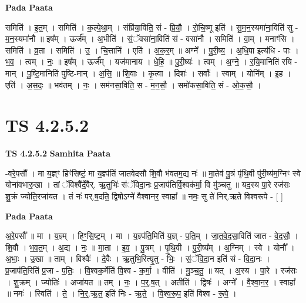 \documentclass[17pt]{extarticle}
\begin{document}
\textbf{Pada Paata} \newline

समिति॑ । इ॒त॒म् । समिति॑ । क॒ल्पे॒था॒म् । संप्रि॑या॒विति॒ सं - प्रि॒यौ॒ । रो॒चि॒ष्णू इति॑ । सु॒म॒न॒स्यमा॑ना॒विति॑ सु - म॒न॒स्यमा॑नौ ॥ इष᳚म् । ऊर्ज᳚म् । अ॒भीति॑ । सं॒ॅवसा॑ना॒विति॑ सं - वसा॑नौ । समिति॑ । वा॒म् । मनाꣳ॑सि । समिति॑ । व्र॒ता । समिति॑ । उ॒ । चि॒त्तानि॑ । एति॑ । अ॒क॒र॒म् ॥ अग्ने᳚ । पु॒री॒ष्य॒ । अ॒धि॒पा इत्य॑धि - पाः । भ॒व॒ । त्वम् । नः॒ ॥ इष᳚म् । ऊर्ज᳚म् । यज॑मानाय । धे॒हि॒ ॥ पु॒री॒ष्यः॑ । त्वम् । अ॒ग्ने॒ । र॒यि॒मानिति॑ रयि - मान् । पु॒ष्टि॒मानिति॑ पुष्टि-मान् । अ॒सि॒ ॥ शि॒वाः । कृ॒त्वा । दिशः॑ । सर्वाः᳚ । स्वाम् । योनि᳚म् । इ॒ह । एति॑ । अ॒स॒दः॒ ॥ भव॑तम् । नः॒ । सम॑नसा॒विति॒ स - म॒न॒सौ॒ । समो॑कसा॒विति॒ सं - ओ॒क॒सौ॒ ।  \newline




\section*{ TS 4.2.5.2 }

\textbf{TS 4.2.5.2 } \newline
\textbf{Samhita Paata} \newline

-वरे॒पसौ᳚ । मा य॒ज्ञ्ꣳ हिꣳ॑सिष्टं॒ मा य॒ज्ञ्प॑तिं जातवेदसौ शि॒वौ भ॑वतम॒द्य नः॑ ॥ मा॒तेव॑ पु॒त्रं पृ॑थि॒वी पु॑री॒ष्य॑म॒ग्निꣳ स्वे योना॑वभारु॒खा । तां ॅविश्वै᳚र्दे॒वैर्. ऋ॒तुभिः॑ संॅविदा॒नः प्र॒जाप॑तिर्वि॒श्वक॑र्मा॒ वि मु॑ञ्चतु ॥ यद॒स्य पा॒रे रज॑सः शु॒क्रं ज्योति॒रजा॑यत । तं नः॑ पर्.ष॒दति॒ द्विषोऽग्ने॑ वैश्वानर॒ स्वाहा᳚ ॥ नमः॒ सु ते॑ निर्.ऋते विश्वरूपे - [  ] \newline

\textbf{Pada Paata} \newline

अ॒रे॒पसौ᳚ ॥ मा । य॒ज्ञ्म् । हिꣳ॒॒सि॒ष्ट॒म् । मा । य॒ज्ञ्प॑ति॒मिति॑ य॒ज्ञ् - प॒ति॒म् । जा॒त॒वे॒द॒सा॒विति॑ जात - वे॒द॒सौ॒ । शि॒वौ । भ॒व॒त॒म् । अ॒द्य । नः॒ ॥ मा॒ता । इ॒व॒ । पु॒त्रम् । पृ॒थि॒वी । पु॒री॒ष्य᳚म् । अ॒ग्निम् । स्वे । योनौ᳚ । अ॒भाः॒ । उ॒खा ॥ ताम् । विश्वैः᳚ । दे॒वैः । ऋ॒तुभि॒रित्यृ॒तु - भिः॒ । सं॒ॅवि॒दा॒न इति॑ सं - वि॒दा॒नः । प्र॒जाप॑ति॒रिति॑ प्र॒जा - प॒तिः॒ । वि॒श्वक॒र्मेति॑ वि॒श्व - क॒र्मा॒ । वीति॑ । मु॒ञ्च॒तु॒ ॥ यत् । अ॒स्य । पा॒रे । रज॑सः । शु॒क्रम् । ज्योतिः॑ । अजा॑यत ॥ तम् । नः॒ । प॒र्॒.ष॒त् । अतीति॑ । द्विषः॑ । अग्ने᳚ । वै॒श्वा॒न॒र॒ । स्वाहा᳚ ॥ नमः॑ । स्विति॑ । ते॒ । नि॒र्॒.ऋ॒त॒ इति॑ निः - ऋ॒ते॒ । वि॒श्व॒रू॒प॒ इति॑ विश्व - रू॒पे॒ ।  \newline
\end{document}

